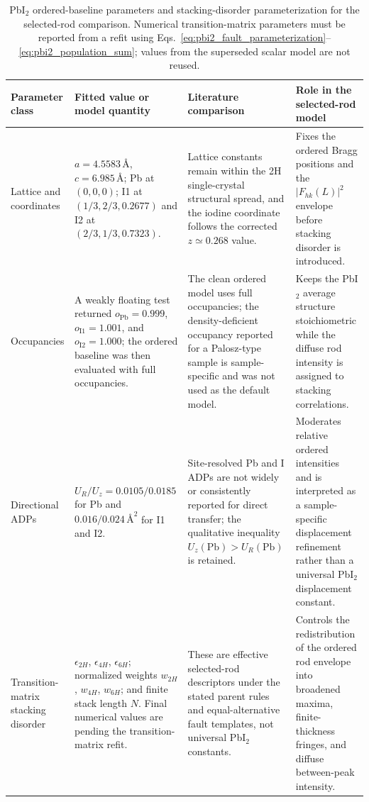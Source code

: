 \begin{table}[H]
  \centering
  \caption{PbI$_2$ ordered-baseline parameters and stacking-disorder
  parameterization for the selected-rod comparison.  Numerical
  transition-matrix parameters must be reported from a refit using
  Eqs.~\eqref{eq:pbi2_fault_parameterization}--\eqref{eq:pbi2_population_sum};
  values from the superseded scalar model are not reused.}
  \label{tab:pbi2_sf_parameters}
  \scriptsize
  \setlength{\tabcolsep}{3pt}
  \renewcommand{\arraystretch}{1.12}
  \begin{tabularx}{\linewidth}{@{}>{\raggedright\arraybackslash}p{2.1cm} >{\raggedright\arraybackslash}X >{\raggedright\arraybackslash}X >{\raggedright\arraybackslash}X@{}}
    \toprule
    Parameter class & Fitted value or model quantity & Literature comparison & Role in the selected-rod model \\
    \midrule
    Lattice and coordinates &
    $a=4.5583\,\text{\AA}$, $c=6.985\,\text{\AA}$; Pb at $(0,0,0)$; I1 at $(1/3,2/3,0.2677)$ and I2 at $(2/3,1/3,0.7323)$. &
    Lattice constants remain within the 2H single-crystal structural spread, and the iodine coordinate follows the corrected $z\simeq0.268$ value.\cite{Minagawa1975,Palosz1990} &
    Fixes the ordered Bragg positions and the $|F_{hk}(L)|^2$ envelope before stacking disorder is introduced. \\
    Occupancies &
    A weakly floating test returned $o_{\mathrm{Pb}}=0.999$, $o_{\mathrm{I1}}=1.001$, and $o_{\mathrm{I2}}=1.000$; the ordered baseline was then evaluated with full occupancies. &
    The clean ordered model uses full occupancies; the density-deficient occupancy reported for a Palosz-type sample is sample-specific and was not used as the default model.\cite{Palosz1990,Lin2019} &
    Keeps the PbI$_2$ average structure stoichiometric while the diffuse rod intensity is assigned to stacking correlations. \\
    Directional ADPs &
    $U_R/U_z=0.0105/0.0185$ for Pb and $0.016/0.024\,\text{\AA}^2$ for I1 and I2. &
    Site-resolved Pb and I ADPs are not widely or consistently reported for direct transfer; the qualitative inequality $U_z(\mathrm{Pb})>U_R(\mathrm{Pb})$ is retained.\cite{Minagawa1975,Trueblood1996} &
    Moderates relative ordered intensities and is interpreted as a sample-specific displacement refinement rather than a universal PbI$_2$ displacement constant. \\
    Transition-matrix stacking disorder &
    $\epsilon_{2H}$, $\epsilon_{4H}$, $\epsilon_{6H}$; normalized weights $w_{2H}$, $w_{4H}$, $w_{6H}$; and finite stack length $N$.  Final numerical values are pending the transition-matrix refit. &
    These are effective selected-rod descriptors under the stated parent rules and equal-alternative fault templates, not universal PbI$_2$ constants. &
    Controls the redistribution of the ordered rod envelope into broadened maxima, finite-thickness fringes, and diffuse between-peak intensity. \\
    \bottomrule
  \end{tabularx}
\end{table}

